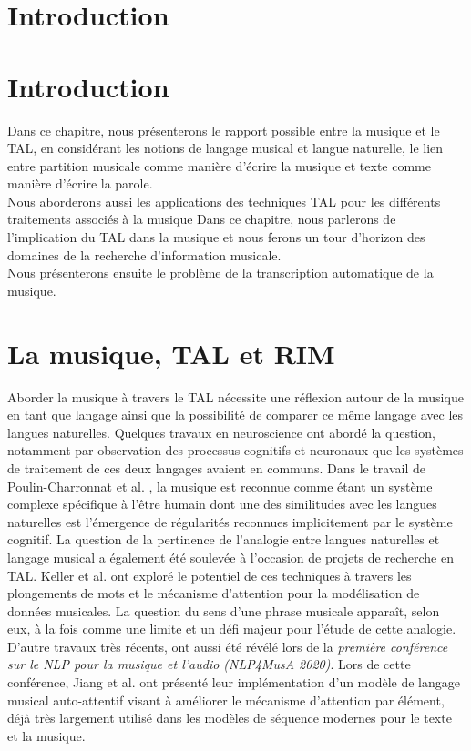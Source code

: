 \section{Introduction}
\section{Introduction}
Dans ce chapitre, nous présenterons le rapport possible entre la musique et le TAL, en considérant les notions de langage musical et langue naturelle, le lien entre partition musicale comme manière d’écrire la musique et texte comme manière d’écrire la parole.\\
Nous aborderons aussi les applications des techniques TAL pour les différents traitements associés à la musique
Dans ce chapitre, nous parlerons de l’implication du TAL dans la musique et nous ferons un tour d’horizon des domaines de la recherche d’information musicale.\\ Nous présenterons ensuite le problème de la transcription automatique de la musique.
\section{La musique, TAL et RIM}
Aborder la musique à travers le TAL nécessite une réflexion autour de la musique en tant que langage ainsi que la possibilité de comparer ce même langage avec les langues naturelles. Quelques travaux en neuroscience ont abordé la question, notamment par observation des processus cognitifs et neuronaux que les systèmes de traitement de ces deux langages avaient en communs. Dans le travail de Poulin-Charronnat et al. \cite{poulincharronnat:hal-01985213}, la musique est reconnue comme étant un système complexe spécifique à l’être humain dont une des similitudes avec les langues naturelles est l’émergence de régularités reconnues implicitement par le système cognitif. La question de la pertinence de l’analogie entre langues naturelles et langage musical a également été soulevée à l’occasion de projets de recherche en TAL. Keller et al. \cite{keller:hal-03279850} ont exploré le potentiel de ces techniques à travers les plongements de mots et le mécanisme d’attention pour la modélisation de données musicales. La question du sens d’une phrase musicale apparaît, selon eux, à la fois comme une limite et un défi majeur pour l’étude de cette analogie.\\
D’autre travaux très récents, ont aussi été révélé lors de la \textit{première conférence sur le NLP pour la musique et l'audio (NLP4MusA 2020)}. Lors de cette conférence, Jiang et al. \cite{Jiang2020DiscoveringMR} ont présenté leur implémentation d’un modèle de langage musical auto-attentif visant à améliorer le mécanisme d'attention par élément, déjà très largement utilisé dans les modèles de séquence modernes pour le texte et la musique.

